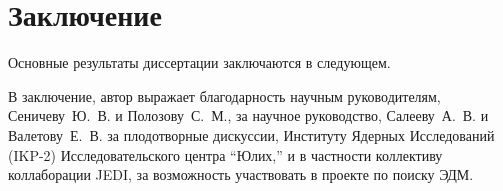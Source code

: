 \chapter*{Заключение}                       %


Основные результаты диссертации заключаются в следующем.


В заключение, автор выражает благодарность научным руководителям, Сеничеву~Ю.~В. и Полозову~С.~М., за научное руководство, Салееву~А.~В. и Валетову~Е.~В. за плодотворные дискуссии, Институту Ядерных Исследований (IKP-2) Исследовательского центра ``Юлих,'' и в частности коллективу коллаборации JEDI, за возможность участвовать в проекте по поиску ЭДМ.
